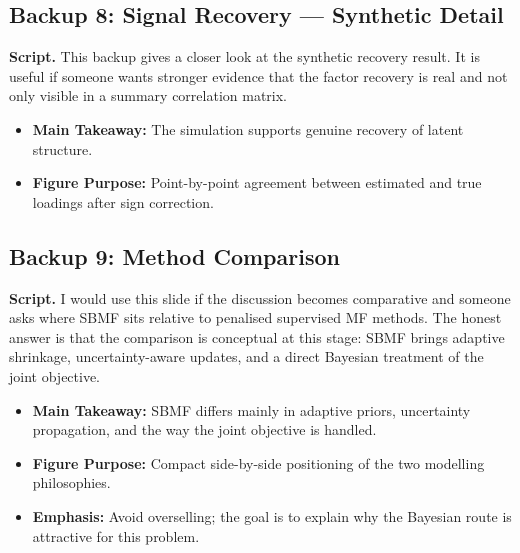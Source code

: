 \documentclass[11pt]{article}
\newcommand{\scriptlabel}{\textbf{Script. }}
\newcommand{\sectionlabel}[1]{\textbf{#1}}
\begin{document}
\subsection*{Backup 8: Signal Recovery --- Synthetic Detail}
\scriptlabel This backup gives a closer look at the synthetic recovery result. It is useful if someone wants stronger evidence that the factor recovery is real and not only visible in a summary correlation matrix.

\begin{itemize}
\item \sectionlabel{Main Takeaway:} The simulation supports genuine recovery of latent structure.
\item \sectionlabel{Figure Purpose:} Point-by-point agreement between estimated and true loadings after sign correction.
\end{itemize}

\subsection*{Backup 9: Method Comparison}
\scriptlabel I would use this slide if the discussion becomes comparative and someone asks where SBMF sits relative to penalised supervised MF methods. The honest answer is that the comparison is conceptual at this stage: SBMF brings adaptive shrinkage, uncertainty-aware updates, and a direct Bayesian treatment of the joint objective.

\begin{itemize}
\item \sectionlabel{Main Takeaway:} SBMF differs mainly in adaptive priors, uncertainty propagation, and the way the joint objective is handled.
\item \sectionlabel{Figure Purpose:} Compact side-by-side positioning of the two modelling philosophies.
\item \sectionlabel{Emphasis:} Avoid overselling; the goal is to explain why the Bayesian route is attractive for this problem.
\end{itemize}
\end{document}
